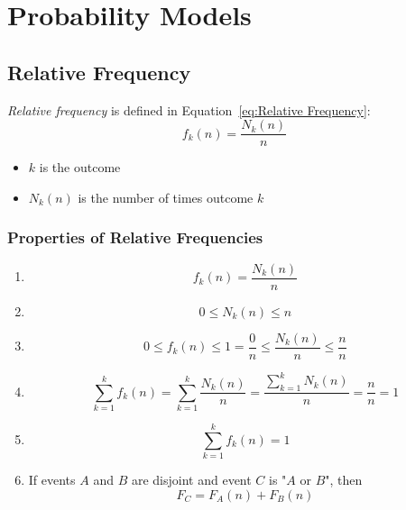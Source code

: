 \section{Probability Models} \label{sec:Probability Models}
	\subsection{Relative Frequency} \label{subsec:Relative Frequency}
		\begin{definition} \label{def:Relative Frequency}
			\emph{Relative frequency} is defined in Equation~\eqref{eq:Relative Frequency}:
			\begin{equation} \label{eq:Relative Frequency}
				f_k (n) = \frac{N_k (n)}{n}
			\end{equation}
			\begin{itemize}[noitemsep, nolistsep]
				\item $k$ is the outcome
				\item $N_k (n)$ is the number of times outcome $k$
			\end{itemize}
		\end{definition}
	
		\subsubsection{Properties of Relative Frequencies} \label {subsec:Properties Relative Frequency}
		\begin{enumerate}[label=\textbf{(\roman*)}, noitemsep, nolistsep]
			\item 
				\begin{equation}
					f_k (n) = \frac{N_k (n)}{n}
				\end{equation}
			\item
				\begin{equation}
					0 \leq N_k (n) \leq n
				\end{equation}
			\item
				\begin{equation}
					0 \leq f_k (n) \leq 1 = \frac{0}{n} \leq \frac{N_k (n)}{n} \leq \frac{n}{n}
				\end{equation}
			\item
				\begin{equation}
					\sum\limits_{k=1}^{k} f_k (n) = \sum\limits_{k=1}^{k} \frac{N_k (n)}{n} = \frac{\sum\limits_{k=1}^{k} N_k (n)}{n} = \frac{n}{n} = 1
				\end{equation}
			\item
				\begin{equation}
					\sum\limits_{k=1}^{k} f_k (n) = 1
				\end{equation}
			\item If events $A$ and $B$ are disjoint and event $C$ is "$A$ or $B$", then 
				\begin{equation}
					F_C = F_A (n) + F_B (n)
				\end{equation}
		\end{enumerate}
